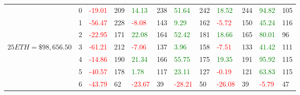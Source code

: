 \begin{table}[htb!]
\begin{adjustwidth}{-0.9in}{-0.9in}
\begin{tabular}{|p{5em}|p{2em}|p{3em}|p{3em}|p{3em}|p{3em}|p{3em}|p{3em}|p{3em}|p{3em}|p{3em}|p{3em}|}
            & 0 & \textcolor{red}{-19.01} & 209 & \textcolor{green}{14.13} & 238 & \textcolor{green}{51.64} & 242 & \textcolor{green}{18.52} & 244 & \textcolor{green}{94.82} & 105\\\cline{3-12}
            & 1 & \textcolor{red}{-56.47} & 228 & \textcolor{red}{-8.08} & 143 & \textcolor{green}{9.29} & 162 & \textcolor{red}{-5.72} & 150 & \textcolor{green}{45.24} & 116\\\cline{3-12}
            & 2 & \textcolor{red}{-22.95} & 171 & \textcolor{green}{22.08} & 164 & \textcolor{green}{52.42} & 181 & \textcolor{green}{18.66} & 165 & \textcolor{green}{80.01} & 96\\\cline{3-12}
            $25 ETH = \$98,656.50$ & 3 & \textcolor{red}{-61.21} & 212 & \textcolor{red}{-7.06} & 137 & \textcolor{green}{3.96} & 158 & \textcolor{red}{-7.51} & 133 & \textcolor{green}{41.42} & 111\\[-3ex]\cline{3-12}
            & 4 & \textcolor{red}{-14.86} & 190 & \textcolor{green}{21.34} & 166 & \textcolor{green}{55.75} & 175 & \textcolor{green}{19.35} & 191 & \textcolor{green}{95.92} & 115\\\cline{3-12}
            & 5 & \textcolor{red}{-40.57} & 178 & \textcolor{green}{1.78} & 117 & \textcolor{green}{23.11} & 127 & \textcolor{red}{-0.19} & 121 & \textcolor{green}{63.83} & 115\\\cline{3-12}
            & 6 & \textcolor{red}{-43.79} & 62 & \textcolor{red}{-23.67} & 39 & \textcolor{red}{-28.21} & 50 & \textcolor{red}{-26.08} & 39 & \textcolor{red}{-5.79} & 47\\\hline\hline


\end{tabular}
\end{adjustwidth}
\end{table}
